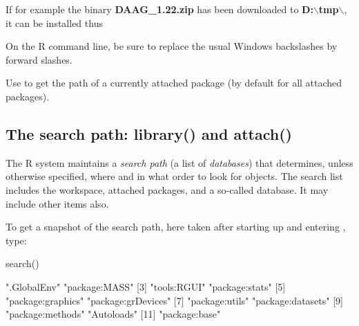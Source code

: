 If for example the binary
\textbf{DAAG\_1.22.zip} has been downloaded to
\textbf{D:$\boldsymbol{\backslash}$tmp$\boldsymbol{\backslash}$}, it
can be installed thus
\begin{knitrout}
\color{fgcolor}\begin{kframe}
\begin{alltt}
\hlstd{(}\hlstd{=}\hlstd{,}
                 \hlstd{=}\hlstd{)}
\end{alltt}
\end{kframe}
\end{knitrout}
On the R command line, be sure to replace the usual Windows backslashes
by forward slashes.

Use  to get the path of a currently attached package
(by default for all attached packages).

\subsection{The search path: library() and attach()}\label{ss:moreattach}
The R system maintains a {\em search path} (a list of {\em databases})
that determines, unless otherwise specified, where and in what order
to look for objects.    The search list
includes the workspace, attached packages, and a so-called
 database. It may include other items also.

To get a snapshot of the search path, here taken after starting up
and entering , type:
\begin{Schunk}
\begin{Sinput}
search()
\end{Sinput}
\begin{Soutput}
 [1] ".GlobalEnv"        "package:MASS"
 [3] "tools:RGUI"        "package:stats"
 [5] "package:graphics"  "package:grDevices"
 [7] "package:utils"     "package:datasets"
 [9] "package:methods"   "Autoloads"
[11] "package:base"
\end{Soutput}
\end{Schunk}

